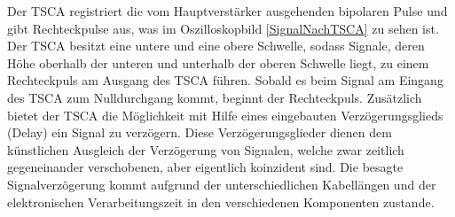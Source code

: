 Der TSCA registriert die vom Hauptverstärker ausgehenden bipolaren Pulse und gibt Rechteckpulse aus, was im Oszilloskopbild \ref{SignalNachTSCA} zu sehen ist.
Der TSCA besitzt eine untere und eine obere Schwelle, sodass Signale, deren Höhe oberhalb der unteren und unterhalb der oberen Schwelle liegt, zu einem Rechteckpuls am Ausgang des TSCA führen.
Sobald es beim Signal am Eingang des TSCA zum Nulldurchgang kommt, beginnt der Rechteckpuls.
Zusätzlich bietet der TSCA die Möglichkeit mit Hilfe eines eingebauten Verzögerungsglieds (Delay) ein Signal zu verzögern.
Diese Verzögerungsglieder dienen dem künstlichen Ausgleich der Verzögerung von Signalen, welche zwar zeitlich gegeneinander verschobenen, aber eigentlich koinzident sind.
Die besagte Signalverzögerung kommt aufgrund der unterschiedlichen Kabellängen und der elektronischen Verarbeitungszeit in den verschiedenen Komponenten zustande.
